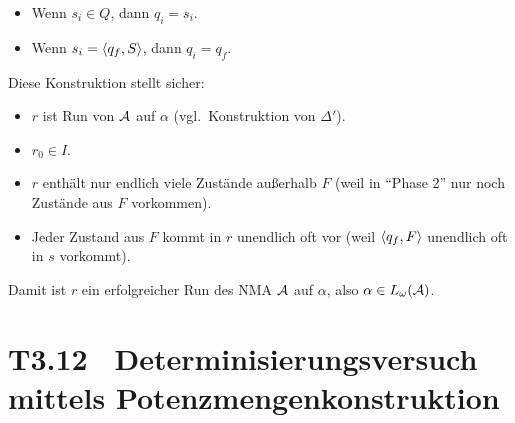 \documentclass[fontsize=11pt, twoside=false, numbers=autoenddot]{scrbook}
\begin{document}
\begin{description}
\begin{itemize}
      \item
        Wenn $s_i \in Q$, dann $q_i = s_i$.
      \item
        Wenn $s_i = \langle q_f,S\rangle$, dann $q_i = q_f$.
    \end{itemize}
    Diese Konstruktion stellt sicher:
    \begin{itemize}
      \item
        $r$ ist Run von $\mathcal{A}$ auf $\alpha$ (vgl.\ Konstruktion von $\Delta'$).
      \item
        $r_0 \in I$.
      \item
        $r$ enthält nur endlich viele Zustände außerhalb $F$ (weil in "`Phase 2"' nur noch Zustände aus $F$ vorkommen).
      \item 
        Jeder Zustand aus $F$ kommt in $r$ unendlich oft vor (weil $\langle q_f,F\rangle$ unendlich oft in $s$ vorkommt).
    \end{itemize}
    Damit ist $r$ ein erfolgreicher Run des NMA $\mathcal{A}$ auf $\alpha$,
    also $\alpha \in L_\omega(\mathcal{A})$.
    \qedhere
\end{description}

\section*{T3.12~ Determinisierungsversuch mittels Potenzmengenkonstruktion}
\end{document}
